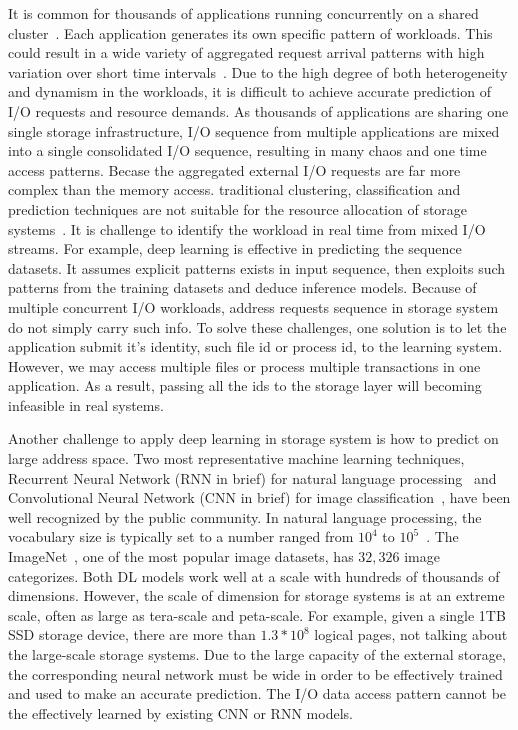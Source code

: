 It is common for thousands of applications running concurrently
on a shared cluster~\cite{stokely2012projecting}.
Each application generates its own specific pattern of workloads.
This could result in a wide variety of aggregated
request arrival patterns with high variation over short time intervals~\cite{reiss2012heterogeneity}.
Due to the high degree of both heterogeneity and dynamism in the workloads,
it is difficult to achieve accurate prediction of I/O requests and resource demands.
As thousands of applications are sharing one single storage infrastructure,
I/O sequence from multiple applications are mixed into a single consolidated I/O sequence,
resulting in many chaos and one time access patterns.
Becase the aggregated external I/O requests are far more complex than the memory access.
traditional clustering, classification and prediction techniques
are not suitable for the resource allocation of storage systems~\cite{ray2017high}.
It is challenge to identify the workload in real time from mixed I/O streams.
For example, deep learning is effective in predicting the sequence datasets.
It assumes explicit patterns exists in input sequence,
then exploits such patterns from the training datasets and deduce inference models.
Because of multiple concurrent I/O workloads,
address requests sequence in storage system do not simply carry such info.
To solve these challenges, one solution is to let the application submit it's identity, such file id or process id, to the learning system.
However, we may access multiple files or process multiple transactions in one application.
As a result, passing all the ids to the storage layer will becoming infeasible in real systems.

Another challenge to apply deep learning in storage system is how to predict on large address space.
Two most representative machine learning techniques,
Recurrent Neural Network (RNN in brief) for natural language processing~\cite{graves2013generating,cho2014learning,li2015constructing}
and Convolutional Neural Network (CNN in brief) for image classification~\cite{lecun1995convolutional,karpathy2014large,kim2014convolutional,abdel2014convolutional,krizhevsky2012imagenet},
have been well recognized by the public community.
In natural language processing, the vocabulary size is
typically set to a number ranged from $10^4$ to $10^5$~\cite{Britz:2017}.
The ImageNet~\cite{deng2009imagenet}, one of the most popular image datasets, has $32,326$ image categorizes.
Both DL models work well at a scale with hundreds of thousands of dimensions.
However, the scale of dimension for storage systems is at an extreme scale,
often as large as tera-scale and peta-scale.
For example, given a single 1TB SSD storage device,
there are more than $1.3*10^8$ logical pages,
not talking about the large-scale storage systems.
Due to the large capacity of the external storage,
the corresponding neural network must be wide in order to be effectively trained
and used to make an accurate prediction.
The I/O data access pattern cannot be the effectively learned
by existing CNN or RNN models.

